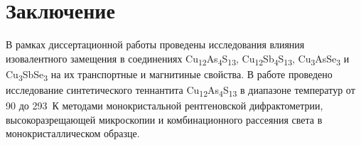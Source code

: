 \chapter*{Заключение}						%



В рамках диссертационной работы проведены исследования влияния изовалентного замещения в соединениях Cu\textsubscript{12}As\textsubscript{4}S\textsubscript{13}, Cu\textsubscript{12}Sb\textsubscript{4}S\textsubscript{13}, Cu\textsubscript{3}AsSe\textsubscript{3} и Cu\textsubscript{3}SbSe\textsubscript{3} на их транспортные и магнитиные свойства.
В работе проведено исследование  синтетического теннантита Cu\textsubscript{12}As\textsubscript{4}S\textsubscript{13} в диапазоне температур от 90 до 293~К методами монокристальной рентгеновской дифрактометрии, высокоразрещающей микроскопии и комбинационного рассеяния света в монокристаллическом образце.

